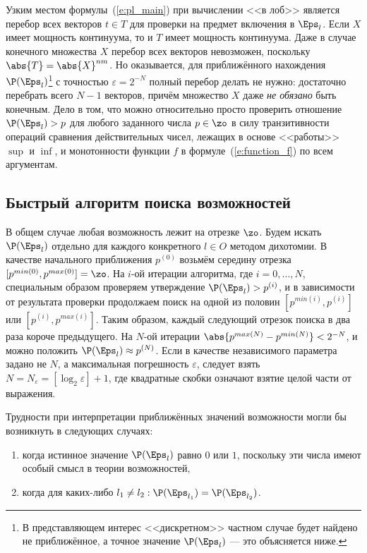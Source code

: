 Узким местом формулы~(\ref{e:pl_main}) при вычислении <<в лоб>> является перебор всех векторов $t \in T$ для проверки на предмет включения в $\Eps_l$. Если $X$ имеет мощность континуума, то и $T$ имеет мощность континуума. Даже в случае конечного множества $X$ перебор всех векторов невозможен, поскольку $\abs{T} = \abs{X}^{nm}$. Но оказывается, для приближённого нахождения $\P(\Eps_l)$\footnote{В представляющем интерес <<дискретном>> частном случае будет найдено не приближённое, а точное значение $\P(\Eps_l)$ --- это объясняется ниже.} с точностью $\varepsilon = 2^{-N}$ полный перебор делать не нужно: достаточно перебрать всего $N-1$ векторов, причём множество $X$ даже {\sl не обязано} быть конечным. Дело в том, что можно относительно просто проверить отношение $\P(\Eps_l) > p$ для любого заданного числа $p \in \zo$ в силу транзитивности операций сравнения действительных чисел, лежащих в основе <<работы>>  $\sup$ и $\inf$, и монотонности функции $f$ в формуле~(\ref{e:function_f}) по всем аргументам. 

\subsection{Быстрый алгоритм поиска возможностей}

В общем случае любая возможность лежит на отрезке $\zo$. Будем искать $\P(\Eps_l)$ отдельно для каждого конкретного $l \in O$ методом дихотомии. В качестве начального приближения $p^{(0)}$ возьмём середину отрезка $[p^{min(0)}, p^{max(0)}] = \zo$. На $i$-ой итерации алгоритма, где $i = 0, \ldots, N$, специальным образом проверяем утверждение $\P(\Eps_l) > p^{(i)}$, и в зависимости от результата проверки продолжаем поиск на одной из половин $[p^{min(i)}, p^{(i)}]$ или $[p^{(i)}, p^{max(i)}]$. Таким образом, каждый следующий отрезок поиска в два раза короче предыдущего.  На $N$-ой итерации $\abs{p^{max(N)} - p^{min(N)}} < 2^{-N}$, и можно положить $\P(\Eps_l) \approx p^{(N)}$. Если в качестве независимого параметра задано не $N$, а максимальная погрешность  $\varepsilon$, следует взять $N = N_{\varepsilon} = [\log_2{\varepsilon}]+1$,  где квадратные скобки означают взятие целой части от выражения. 

Трудности при интерпретации приближённых значений возможности могли бы возникнуть в следующих случаях:
\begin{enumerate}
  \item когда истинное значение $\P(\Eps_l)$ равно $0$ или $1$, поскольку эти числа имеют особый смысл в теории возможностей,
  \item когда для каких-либо $l_1 \neq l_2: \P(\Eps_{l_1}) = \P(\Eps_{l_2})$.
\end{enumerate}

